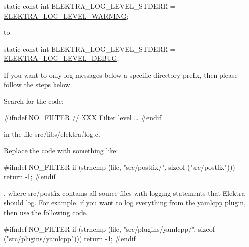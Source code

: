 \begin{DoxyCode}
\textcolor{keyword}{static} \textcolor{keyword}{const} \textcolor{keywordtype}{int} ELEKTRA\_LOG\_LEVEL\_STDERR = \hyperlink{kdblogger_8h_a4096a2ccd61c6f5ad60e9015fd1bbb4ba0524fff5c46e0cf07287c473c46cc8e2}{ELEKTRA\_LOG\_LEVEL\_WARNING};
\end{DoxyCode}


to


\begin{DoxyCode}
\textcolor{keyword}{static} \textcolor{keyword}{const} \textcolor{keywordtype}{int} ELEKTRA\_LOG\_LEVEL\_STDERR = \hyperlink{kdblogger_8h_a4096a2ccd61c6f5ad60e9015fd1bbb4ba24c7a4c44a8b99b978dc99806d083386}{ELEKTRA\_LOG\_LEVEL\_DEBUG};
\end{DoxyCode}


If you want to only log messages below a specific directory prefix, then please follow the steps below.


\begin{DoxyEnumerate}
\item Search for the code\+:
\end{DoxyEnumerate}


\begin{DoxyCode}
\textcolor{preprocessor}{#ifndef NO\_FILTER}
     \textcolor{comment}{// XXX Filter level …}
\textcolor{preprocessor}{#endif}
\end{DoxyCode}


in the file {\ttfamily \hyperlink{log_8c}{src/libs/elektra/log.\+c}}.


\begin{DoxyEnumerate}
\item Replace the code with something like\+:
\end{DoxyEnumerate}


\begin{DoxyCode}
\textcolor{preprocessor}{#ifndef NO\_FILTER}
     \textcolor{keywordflow}{if} (strncmp (file, \textcolor{stringliteral}{"src/postfix/"}, \textcolor{keyword}{sizeof} (\textcolor{stringliteral}{"src/postfix"}))) \textcolor{keywordflow}{return} -1;
\textcolor{preprocessor}{#endif}
\end{DoxyCode}


, where {\ttfamily src/postfix} contains all source files with logging statements that Elektra should log. For example, if you want to log everything from the {\ttfamily yamlcpp} plugin, then use the following code.


\begin{DoxyCode}
\textcolor{preprocessor}{#ifndef NO\_FILTER}
     \textcolor{keywordflow}{if} (strncmp (file, \textcolor{stringliteral}{"src/plugins/yamlcpp/"}, \textcolor{keyword}{sizeof} (\textcolor{stringliteral}{"src/plugins/yamlcpp"}))) \textcolor{keywordflow}{return} -1;
\textcolor{preprocessor}{#endif}
\end{DoxyCode}


